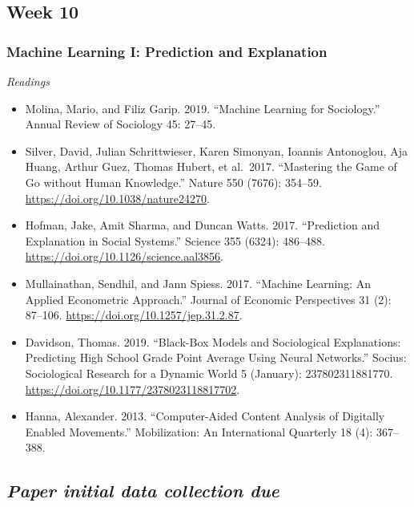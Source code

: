 \documentclass[
  10pt,
]{article}
\providecommand{\tightlist}{%
  \setlength{\itemsep}{0pt}\setlength{\parskip}{0pt}}
\begin{document}
\hypertarget{week-10}{%
\subsection{Week 10}\label{week-10}}

\hypertarget{machine-learning-i-prediction-and-explanation}{%
\subsubsection{Machine Learning I: Prediction and
Explanation}\label{machine-learning-i-prediction-and-explanation}}

\emph{Readings}

\begin{itemize}
\tightlist
\item
  Molina, Mario, and Filiz Garip. 2019. ``Machine Learning for
  Sociology.'' Annual Review of Sociology 45: 27--45.
\item
  Silver, David, Julian Schrittwieser, Karen Simonyan, Ioannis
  Antonoglou, Aja Huang, Arthur Guez, Thomas Hubert, et al.~2017.
  ``Mastering the Game of Go without Human Knowledge.'' Nature 550
  (7676): 354--59. \url{https://doi.org/10.1038/nature24270}.
\item
  Hofman, Jake, Amit Sharma, and Duncan Watts. 2017. ``Prediction and
  Explanation in Social Systems.'' Science 355 (6324): 486--488.
  \url{https://doi.org/10.1126/science.aal3856}.
\item
  Mullainathan, Sendhil, and Jann Spiess. 2017. ``Machine Learning: An
  Applied Econometric Approach.'' Journal of Economic Perspectives 31
  (2): 87--106. \url{https://doi.org/10.1257/jep.31.2.87}.
\item
  Davidson, Thomas. 2019. ``Black-Box Models and Sociological
  Explanations: Predicting High School Grade Point Average Using Neural
  Networks.'' Socius: Sociological Research for a Dynamic World 5
  (January): 237802311881770.
  \url{https://doi.org/10.1177/2378023118817702}.
\item
  Hanna, Alexander. 2013. ``Computer-Aided Content Analysis of Digitally
  Enabled Movements.'' Mobilization: An International Quarterly 18 (4):
  367--388.
\end{itemize}

\hypertarget{paper-initial-data-collection-due}{%
\subsection{\texorpdfstring{\emph{Paper initial data collection
due}}{Paper initial data collection due}}\label{paper-initial-data-collection-due}}
\end{document}
